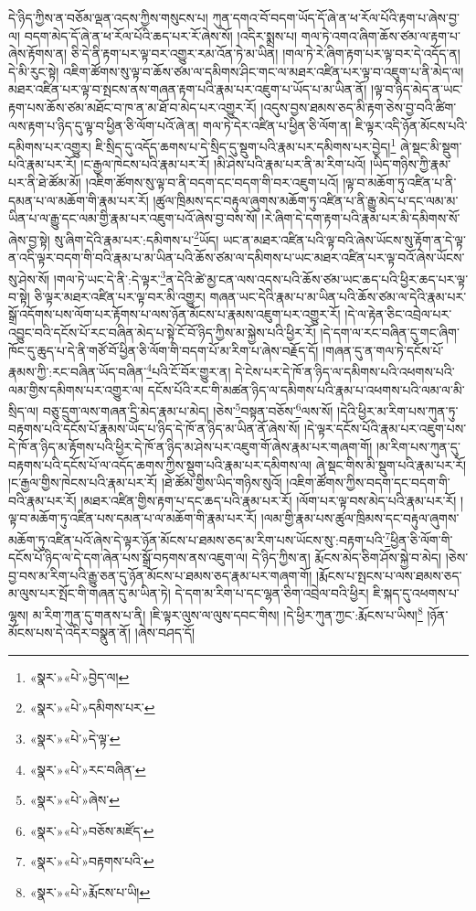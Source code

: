 དེ་ཉིད་ཀྱིས་ན་བཅོམ་ལྡན་འདས་ཀྱིས་གསུངས་པ། ཀུན་དགའ་བོ་བདག་ཡོད་དོ་ཞེ་ན་ཕ་རོལ་པོའི་རྟག་པ་ཞེས་བྱ་ལ། བདག་མེད་དོ་ཞེ་ན་ཕ་རོལ་པོའི་ཆད་པར་རོ་ཞེས་སོ། །འདིར་སྨྲས་པ། གལ་ཏེ་འགའ་ཞིག་ཆོས་ཙམ་ལ་རྟག་པ་ཞེས་རྟོགས་ན། ཅི་དེ་ནི་རྟག་པར་ལྟ་བར་འགྱུར་རམ་འོན་ཏེ་མ་ཡིན། །གལ་ཏེ་རེ་ཞིག་རྟག་པར་ལྟ་བར་དེ་འདོད་ན། དེ་མི་རུང་སྟེ། འཇིག་ཚོགས་སུ་ལྟ་བ་ཆོས་ཙམ་ལ་དམིགས་ཤིང་གང་ལ་མཐར་འཛིན་པར་ལྟ་བ་འཇུག་པ་ནི་མེད་ལ། མཐར་འཛིན་པར་ལྟ་བ་སྤངས་ནས་གཞན་རྟག་པའི་རྣམ་པར་འཇུག་པ་ཡོད་པ་མ་ཡིན་ནོ། །ལྟ་བ་ཉིད་མེད་ན་ཡང་རྟག་པས་ཆོས་ཙམ་མཐོང་བ་ཁ་ན་མ་ཐོ་བ་མེད་པར་འགྱུར་རོ། །འདུས་བྱས་ཐམས་ཅད་མི་རྟག་ཅེས་བྱ་བའི་ཚིག་ལས་རྟག་པ་ཉིད་དུ་ལྟ་བ་ཕྱིན་ཅི་ལོག་པའོ་ཞེ་ན། གལ་ཏེ་དེར་འཛིན་པ་ཕྱིན་ཅི་ལོག་ན། ཇི་ལྟར་འདི་ཉོན་མོངས་པའི་དམིགས་པར་འགྱུར། ཇི་སྲིད་དུ་འདོད་ཆགས་པ་དེ་སྲིད་དུ་སྡུག་པའི་རྣམ་པར་དམིགས་པར་བྱེད།\footnote{«སྣར་»«པེ་»བྱེད་ལ།} ཞེ་སྡང་མི་སྡུག་པའི་རྣམ་པར་རོ། །ང་རྒྱལ་ཁེངས་པའི་རྣམ་པར་རོ། །མི་ཤེས་པའི་རྣམ་པར་ནི་མ་རིག་པའོ། །ཡིད་གཉིས་ཀྱི་རྣམ་པར་ནི་ཐེ་ཚོམ་མོ། །འཇིག་ཚོགས་སུ་ལྟ་བ་ནི་བདག་དང་བདག་གི་བར་འཇུག་པའོ། །ལྟ་བ་མཆོག་ཏུ་འཛིན་པ་ནི་དམན་པ་ལ་མཆོག་གི་རྣམ་པར་རོ། །ཚུལ་ཁྲིམས་དང་བརྟུལ་ཞུགས་མཆོག་ཏུ་འཛིན་པ་ནི་རྒྱུ་མེད་པ་དང་ལམ་མ་ཡིན་པ་ལ་རྒྱུ་དང་ལམ་གྱི་རྣམ་པར་འཇུག་པའོ་ཞེས་བྱ་བས་སོ། །རེ་ཞིག་དེ་དག་རྟག་པའི་རྣམ་པར་མི་དམིགས་སོ་ཞེས་བྱ་སྟེ། སུ་ཞིག་དེའི་རྣམ་པར་:དམིགས་པ་\footnote{«སྣར་»«པེ་»དམིགས་པར་}ཡོད། ཡང་ན་མཐར་འཛིན་པའི་ལྟ་བའི་ཞེས་ཡོངས་སུ་རྟོག་ན་དེ་ལྟ་ན་འདི་ལྟར་བདག་གི་བའི་རྣམ་པ་མ་ཡིན་པའི་ཆོས་ཙམ་ལ་དམིགས་པ་ཡང་མཐར་འཛིན་པར་ལྟ་བའོ་ཞེས་ཡོངས་སུ་ཤེས་སོ། །གལ་ཏེ་ཡང་དེ་ནི་:དེ་ལྟར་\footnote{«སྣར་»«པེ་»དེ་ལྟ་}ན་དེའི་ཚེ་མྱ་ངན་ལས་འདས་པའི་ཆོས་ཙམ་ཡང་ཆད་པའི་ཕྱིར་ཆད་པར་ལྟ་བ་སྟེ། ཅི་ལྟར་མཐར་འཛིན་པར་ལྟ་བར་མི་འགྱུར། གཞན་ཡང་དེའི་རྣམ་པ་མ་ཡིན་པའི་ཆོས་ཙམ་ལ་དེའི་རྣམ་པར་སྒྲོ་འདོགས་པས་ལོག་པར་རྟོགས་པ་ལས་ཉོན་མོངས་པ་རྣམས་འཇུག་པར་འགྱུར་རོ། །དེ་ལ་རྟེན་ཅིང་འབྲེལ་པར་འབྱུང་བའི་དངོས་པོ་རང་བཞིན་མེད་པ་སྟེ་ངོ་བོ་ཉིད་ཀྱིས་མ་སྐྱེས་པའི་ཕྱིར་རོ། །དེ་དག་ལ་རང་བཞིན་དུ་གང་ཞིག་ཁོང་དུ་ཆུད་པ་དེ་ནི་གཙོ་བོ་ཕྱིན་ཅི་ལོག་གི་བདག་པོ་མ་རིག་པ་ཞེས་བརྗོད་དོ། །གཞན་དུ་ན་གལ་ཏེ་དངོས་པོ་རྣམས་ཀྱི་:རང་བཞིན་ཡོད་བཞིན་\footnote{«སྣར་»«པེ་»རང་བཞིན་}པའི་ངོ་བོར་གྱུར་ན། དེ་ངེས་པར་དེ་ཁོ་ན་ཉིད་ལ་དམིགས་པའི་འཕགས་པའི་ལམ་གྱིས་དམིགས་པར་འགྱུར་ལ། དངོས་པོའི་རང་གི་མཚན་ཉིད་ལ་དམིགས་པའི་རྣམ་པ་འཕགས་པའི་ལམ་ལ་མི་སྲིད་ལ། བཅུ་དྲུག་ལས་གཞན་དྲི་མེད་རྣམ་པ་མེད། །ཅེས་\footnote{«སྣར་»«པེ་»ཞེས་}བསྟན་བཅོས་\footnote{«སྣར་»«པེ་»བཅོས་མཛོད་}ལས་སོ། །དེའི་ཕྱིར་མ་རིག་པས་ཀུན་ཏུ་བརྟགས་པའི་དངོས་པོ་རྣམས་ཡོད་པ་ཉིད་དེ་ཁོ་ན་ཉིད་མ་ཡིན་ནོ་ཞེས་སོ། །དེ་ལྟར་དངོས་པོའི་རྣམ་པར་འཇུག་པས་དེ་ཁོ་ན་ཉིད་མ་རྟོགས་པའི་ཕྱིར་དེ་ཁོ་ན་ཉིད་མ་ཤེས་པར་འཇུག་གོ་ཞེས་རྣམ་པར་གཞག་གོ། །མ་རིག་པས་ཀུན་དུ་བརྟགས་པའི་དངོས་པོ་ལ་འདོད་ཆགས་ཀྱིས་སྡུག་པའི་རྣམ་པར་དམིགས་ལ། ཞེ་སྡང་གིས་མི་སྡུག་པའི་རྣམ་པར་རོ། །ང་རྒྱལ་གྱིས་ཁེངས་པའི་རྣམ་པར་རོ། །ཐེ་ཚོམ་གྱིས་ཡིད་གཉིས་སུའོ། །འཇིག་ཚོགས་ཀྱིས་བདག་དང་བདག་གི་བའི་རྣམ་པར་རོ། །མཐར་འཛིན་གྱིས་རྟག་པ་དང་ཆད་པའི་རྣམ་པར་རོ། །ལོག་པར་ལྟ་བས་མེད་པའི་རྣམ་པར་རོ། །ལྟ་བ་མཆོག་ཏུ་འཛིན་པས་དམན་པ་ལ་མཆོག་གི་རྣམ་པར་རོ། །ལམ་གྱི་རྣམ་པས་ཚུལ་ཁྲིམས་དང་བརྟུལ་ཞུགས་མཆོག་ཏུ་འཛིན་པའོ་ཞེས་དེ་ལྟར་ཉོན་མོངས་པ་ཐམས་ཅད་མ་རིག་པས་ཡོངས་སུ་:བརྟག་པའི་\footnote{«སྣར་»«པེ་»བརྟགས་པའི་}ཕྱིན་ཅི་ལོག་གི་དངོས་པོ་ཉིད་ལ་དེ་དག་ཞེན་པས་སྒྲོ་བཏགས་ནས་འཇུག་ལ། དེ་ཉིད་ཀྱིས་ན། རྨོངས་མེད་ཅིག་ཤོས་སྐྱེ་བ་མེད། །ཅེས་བྱ་བས་མ་རིག་པའི་རྒྱུ་ཅན་དུ་ཉོན་མོངས་པ་ཐམས་ཅད་རྣམ་པར་གཞག་གོ། །རྨོངས་པ་སྤངས་པ་ལས་ཐམས་ཅད་མ་ལུས་པར་སྤོང་གི་གཞན་དུ་མ་ཡིན་ཏེ། དེ་དག་མ་རིག་པ་དང་ལྷན་ཅིག་འབྲེལ་བའི་ཕྱིར། ཇི་སྐད་དུ་འཕགས་པ་ལྷས། མ་རིག་ཀུན་དུ་གནས་པ་ནི། །ཇི་ལྟར་ལུས་ལ་ལུས་དབང་གིས། །དེ་ཕྱིར་ཀུན་ཀྱང་:རྨོངས་པ་ཡིས།\footnote{«སྣར་»«པེ་»རྨོངས་པ་ཡི།} །ཉོན་མོངས་པས་དེ་འདིར་བསྣུན་ནོ། །ཞེས་བཤད་དོ། 